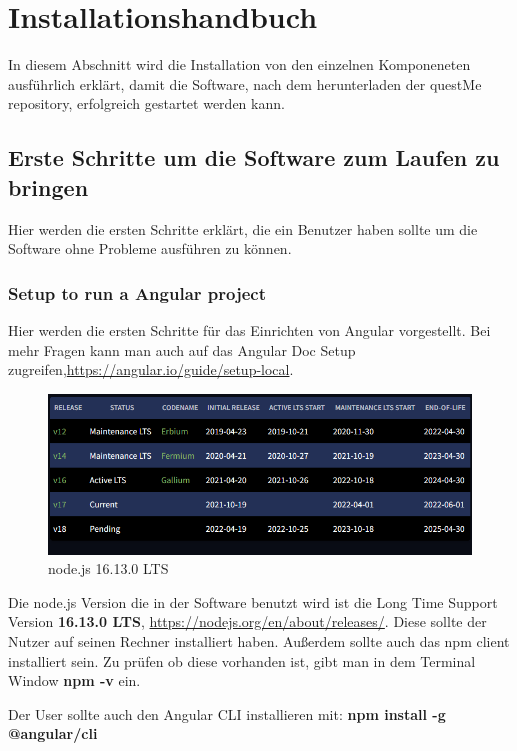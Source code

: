 \section{Installationshandbuch}
In diesem Abschnitt wird die Installation von den einzelnen Komponeneten
ausführlich erklärt, damit die Software, nach dem herunterladen der questMe repository, erfolgreich gestartet werden kann.

\subsection{Erste Schritte um die Software zum Laufen zu bringen}
Hier werden die ersten Schritte erklärt, die ein Benutzer haben sollte um die
Software ohne Probleme ausführen zu können.

\subsubsection{Setup to run a Angular project}
Hier werden die ersten Schritte für das Einrichten von Angular vorgestellt.
Bei mehr Fragen kann man auch auf das Angular Doc Setup zugreifen,\href{https://angular.io/guide/setup-local}{https://angular.io/guide/setup-local}.
\begin{figure}[H]
    \centering
    \includegraphics[width=1.0\textwidth]{bilder/installationshandbuch/node.js_version_16.13.0_LTS.PNG}
    \caption{node.js 16.13.0 LTS}
    \label{fig:node.js_16.13.0_LTS}
\end{figure}
\noindent Die node.js Version die in der Software benutzt wird ist die Long Time Support Version \textbf{16.13.0 LTS}, \href{https://nodejs.org/en/about/releases/}{https://nodejs.org/en/about/releases/}.
Diese sollte der Nutzer auf seinen Rechner installiert haben.
Außerdem sollte auch das npm client installiert sein. Zu prüfen ob diese vorhanden ist,
gibt man in dem Terminal Window \textbf{npm -v} ein.\newline

\noindent Der User sollte auch den Angular CLI installieren mit: 
\textbf{npm install -g @angular/cli}

